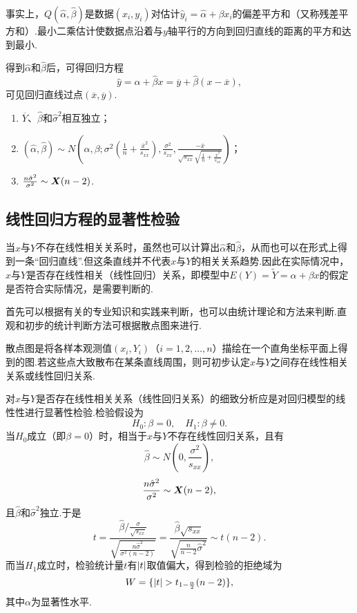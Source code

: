 事实上，\(Q(\hat{\alpha},\hat{\beta})\)是数据\((x_i,y_i)\)对估计\(\hat{y}_i=\hat{\alpha}+\beta x_i\)的偏差平方和（又称残差平方和）.最小二乘估计使数据点沿着与\(y\)轴平行的方向到回归直线的距离的平方和达到最小.

得到\(\hat{\alpha}\)和\(\hat{\beta}\)后，可得回归方程\[
\hat{y} = \hat{\alpha} + \hat{\beta} x
= \overline{y} + \hat{\beta} (x - \overline{x}),
\]可见回归直线过点\((\overline{x},\overline{y})\).

\begin{theorem}
\begin{enumerate}
\item \(\overline{Y}\)、\(\hat{\beta}\)和\(\hat{\sigma}^2\)相互独立；
\item \((\hat{\alpha},\hat{\beta}) \sim N\left(
	\alpha, \beta;
	\sigma^2 \left( \frac{1}{n} + \frac{\overline{x}^2}{s_{xx}} \right),
	\frac{\sigma^2}{s_{xx}},
	\frac{-\overline{x}}{
		\sqrt{s_{xx}} \sqrt{\frac{1}{n} + \frac{\overline{x}^2}{s_{xx}}}
	}
\right)\)；
\item \(\frac{n \hat{\sigma}^2}{\sigma^2} \sim \boldsymbol{X}(n-2)\).
\end{enumerate}
\end{theorem}

\subsection{线性回归方程的显著性检验}
当\(x\)与\(Y\)不存在线性相关关系时，虽然也可以计算出\(\hat{\alpha}\)和\(\hat{\beta}\)，从而也可以在形式上得到一条“回归直线”.但这条直线并不代表\(x\)与\(Y\)的相关关系趋势.因此在实际情况中，\(x\)与\(Y\)是否存在线性相关（线性回归）关系，即模型中\(E(Y) = \widetilde{Y} = \alpha + \beta x\)的假定是否符合实际情况，是需要判断的.

首先可以根据有关的专业知识和实践来判断，也可以由统计理论和方法来判断.直观和初步的统计判断方法可根据散点图来进行.

散点图是将各样本观测值\((x_i,Y_i)\)（\(i=1,2,\dotsc,n\)）描绘在一个直角坐标平面上得到的图.若这些点大致散布在某条直线周围，则可初步认定\(x\)与\(Y\)之间存在线性相关关系或线性回归关系.

对\(x\)与\(Y\)是否存在线性相关关系（线性回归关系）的细致分析应是对回归模型的线性性进行显著性检验.检验假设为\[
H_0: \beta = 0, \quad H_1: \beta \neq 0.
\]当\(H_0\)成立（即\(\beta = 0\)）时，相当于\(x\)与\(Y\)不存在线性回归关系，且有\[
\hat{\beta} \sim N\left(0, \frac{\sigma^2}{s_{xx}}\right),
\]\[
\frac{n \hat{\sigma}^2}{\sigma^2} \sim \boldsymbol{X}(n-2),
\]且\(\hat{\beta}\)和\(\hat{\sigma}^2\)独立.于是\[
t = \frac{\hat{\beta} / \frac{\sigma}{\sqrt{s_{xx}}}}{\sqrt{\frac{n\hat{\sigma}^2}{\sigma^2(n-2)}}}
= \frac{\hat{\beta} \sqrt{s_{xx}}}{\sqrt{\frac{n}{n-2} \hat{\sigma}^2}}
\sim t(n-2).
\]而当\(H_1\)成立时，检验统计量\(t\)有\(\abs{t}\)取值偏大，得到检验的拒绝域为\[
W = \{ \abs{t} > t_{1-\frac{\alpha}{2}}(n-2) \},
\]其中\(\alpha\)为显著性水平.

